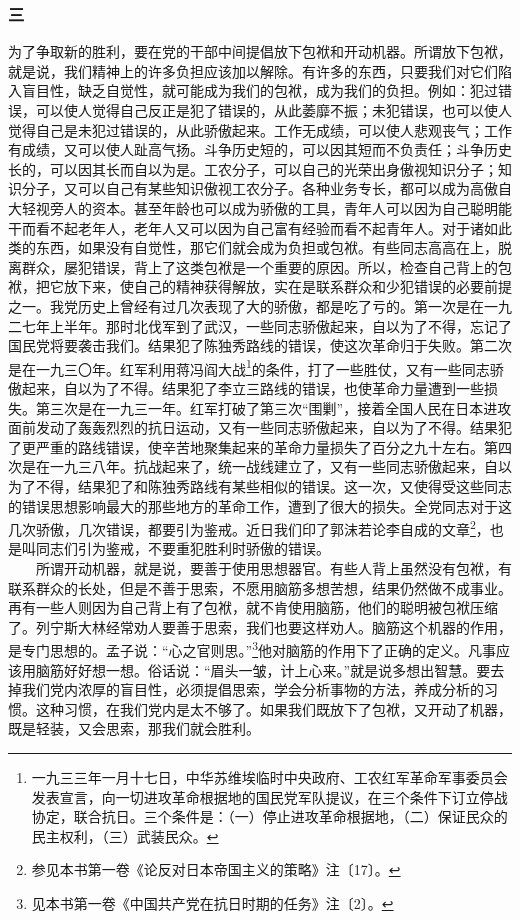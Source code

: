\documentclass[cn,11pt,chinese]{elegantbook}
\def\myformat#1{\hfil\hfil #1}
\begin{document}
\subsubsection*{\myformat{三}}
为了争取新的胜利，要在党的干部中间提倡放下包袱和开动机器。所谓放下包袱，就是说，我们精神上的许多负担应该加以解除。有许多的东西，只要我们对它们陷入盲目性，缺乏自觉性，就可能成为我们的包袱，成为我们的负担。例如：犯过错误，可以使人觉得自己反正是犯了错误的，从此萎靡不振；未犯错误，也可以使人觉得自己是未犯过错误的，从此骄傲起来。工作无成绩，可以使人悲观丧气；工作有成绩，又可以使人趾高气扬。斗争历史短的，可以因其短而不负责任；斗争历史长的，可以因其长而自以为是。工农分子，可以自己的光荣出身傲视知识分子；知识分子，又可以自己有某些知识傲视工农分子。各种业务专长，都可以成为高傲自大轻视旁人的资本。甚至年龄也可以成为骄傲的工具，青年人可以因为自己聪明能干而看不起老年人，老年人又可以因为自己富有经验而看不起青年人。对于诸如此类的东西，如果没有自觉性，那它们就会成为负担或包袱。有些同志高高在上，脱离群众，屡犯错误，背上了这类包袱是一个重要的原因。所以，检查自己背上的包袱，把它放下来，使自己的精神获得解放，实在是联系群众和少犯错误的必要前提之一。我党历史上曾经有过几次表现了大的骄傲，都是吃了亏的。第一次是在一九二七年上半年。那时北伐军到了武汉，一些同志骄傲起来，自以为了不得，忘记了国民党将要袭击我们。结果犯了陈独秀路线的错误，使这次革命归于失败。第二次是在一九三〇年。红军利用蒋冯阎大战\footnote[20]{ 一九三三年一月十七日，中华苏维埃临时中央政府、工农红军革命军事委员会发表宣言，向一切进攻革命根据地的国民党军队提议，在三个条件下订立停战协定，联合抗日。三个条件是：（一）停止进攻革命根据地，（二）保证民众的民主权利，（三）武装民众。}的条件，打了一些胜仗，又有一些同志骄傲起来，自以为了不得。结果犯了李立三路线的错误，也使革命力量遭到一些损失。第三次是在一九三一年。红军打破了第三次“围剿”，接着全国人民在日本进攻面前发动了轰轰烈烈的抗日运动，又有一些同志骄傲起来，自以为了不得。结果犯了更严重的路线错误，使辛苦地聚集起来的革命力量损失了百分之九十左右。第四次是在一九三八年。抗战起来了，统一战线建立了，又有一些同志骄傲起来，自以为了不得，结果犯了和陈独秀路线有某些相似的错误。这一次，又使得受这些同志的错误思想影响最大的那些地方的革命工作，遭到了很大的损失。全党同志对于这几次骄傲，几次错误，都要引为鉴戒。近日我们印了郭沫若论李自成的文章\footnote[21]{ 参见本书第一卷《论反对日本帝国主义的策略》注〔17〕。}，也是叫同志们引为鉴戒，不要重犯胜利时骄傲的错误。\\
　　所谓开动机器，就是说，要善于使用思想器官。有些人背上虽然没有包袱，有联系群众的长处，但是不善于思索，不愿用脑筋多想苦想，结果仍然做不成事业。再有一些人则因为自己背上有了包袱，就不肯使用脑筋，他们的聪明被包袱压缩了。列宁斯大林经常劝人要善于思索，我们也要这样劝人。脑筋这个机器的作用，是专门思想的。孟子说：“心之官则思。”\footnote[22]{ 见本书第一卷《中国共产党在抗日时期的任务》注〔2〕。}他对脑筋的作用下了正确的定义。凡事应该用脑筋好好想一想。俗话说：“眉头一皱，计上心来。”就是说多想出智慧。要去掉我们党内浓厚的盲目性，必须提倡思索，学会分析事物的方法，养成分析的习惯。这种习惯，在我们党内是太不够了。如果我们既放下了包袱，又开动了机器，既是轻装，又会思索，那我们就会胜利。\\
\end{document}
